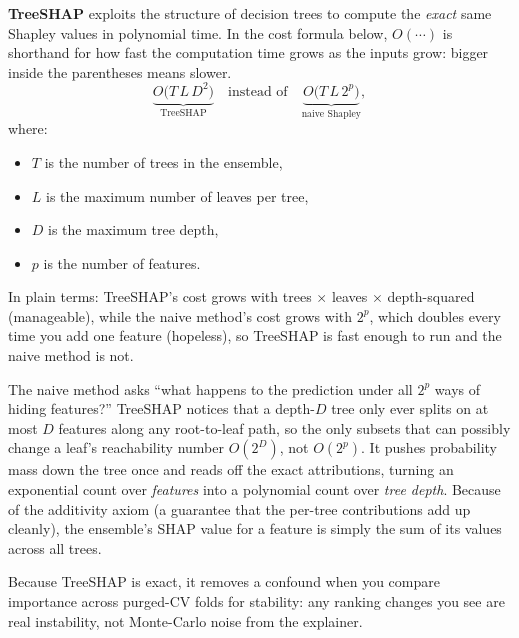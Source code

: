 \textbf{TreeSHAP} \citep{Lundberg2020} exploits the structure of decision
trees to compute the \emph{exact} same Shapley values in polynomial time.  In
the cost formula below, $O(\cdots)$ is shorthand for how fast the computation
time grows as the inputs grow: bigger inside the parentheses means slower.
\begin{equation}\label{eq:trees:treeshap_cost}
  \underbrace{O\!\big(T \, L \, D^2\big)}_{\text{TreeSHAP}}
  \quad\text{instead of}\quad
  \underbrace{O\!\big(T \, L \, 2^{p}\big)}_{\text{naive Shapley}},
\end{equation}
where:
\begin{itemize}[leftmargin=1.8em]
  \item $T$ is the number of trees in the ensemble,
  \item $L$ is the maximum number of leaves per tree,
  \item $D$ is the maximum tree depth,
  \item $p$ is the number of features.
\end{itemize}
In plain terms: TreeSHAP's cost grows with trees $\times$ leaves $\times$
depth-squared (manageable), while the naive method's cost grows with $2^p$,
which doubles every time you add one feature (hopeless), so TreeSHAP is fast
enough to run and the naive method is not.

\begin{intuition}
The naive method asks ``what happens to the prediction under all $2^p$
ways of hiding features?''  TreeSHAP notices that a depth-$D$ tree only ever
splits on at most $D$ features along any root-to-leaf path, so the only
subsets that can possibly change a leaf's reachability number $O(2^D)$, not
$O(2^p)$.  It pushes probability mass down the tree once and reads off the
exact attributions, turning an exponential count over \emph{features} into a
polynomial count over \emph{tree depth}.  Because of the additivity axiom
(a guarantee that the per-tree contributions add up cleanly), the ensemble's
SHAP value for a feature is simply the sum of its values across all trees.
\end{intuition}

\begin{projectconnection}
Because TreeSHAP is exact, it
removes a confound when you compare importance across purged-CV folds for
stability: any ranking changes you see are real instability, not Monte-Carlo
noise from the explainer.
\end{projectconnection}

